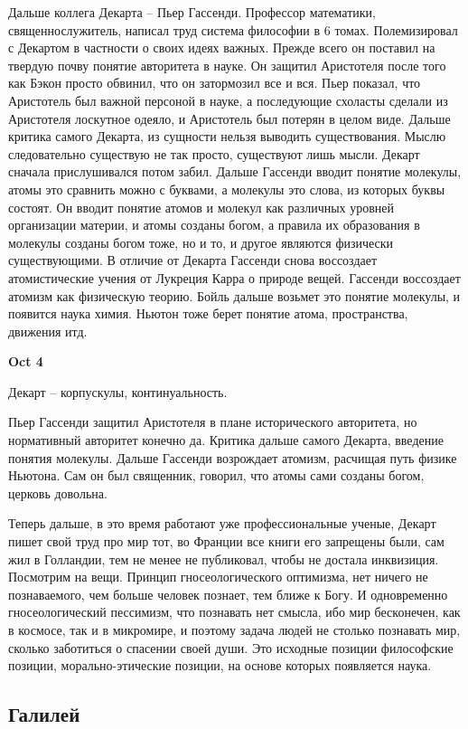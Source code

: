 \documentclass[a4paper, 12pt]{article}
\begin{document}
Дальше коллега Декарта -- Пьер Гассенди. Профессор математики, 
священнослужитель, написал труд система философии в 6 томах. 
Полемизировал с Декартом в частности о своих идеях важных. Прежде всего 
он поставил на твердую почву понятие авторитета в науке. Он защитил 
Аристотеля после того как Бэкон просто обвинил, что он затормозил все 
и вся. Пьер показал, что Аристотель был важной персоной в науке, 
а последующие схоласты сделали из Аристотеля лоскутное одеяло, 
и Аристотель был потерян в целом виде. Дальше критика самого Декарта, из 
сущности нельзя выводить существования. Мыслю следовательно существую не 
так просто, существуют лишь мысли. Декарт сначала прислушивался потом 
забил. Дальше Гассенди вводит понятие молекулы, атомы это сравнить можно 
с буквами, а молекулы это слова, из которых буквы состоят. Он вводит 
понятие атомов и молекул как различных уровней организации материи, 
и атомы созданы богом, а правила их образования в молекулы созданы богом 
тоже, но и то, и другое являются физически существующими. В отличие от 
Декарта Гассенди снова воссоздает атомистические учения от Лукреция 
Карра о природе вещей. Гассенди воссоздает атомизм как физическую 
теорию. Бойль дальше возьмет это понятие молекулы, и появится наука 
химия. Ньютон тоже берет понятие атома, пространства, движения итд.

\hfill \textbf{Oct 4}

Декарт -- корпускулы, континуальность.

Пьер Гассенди защитил Аристотеля в плане исторического авторитета, но 
нормативный авторитет конечно да. Критика дальше самого Декарта, 
введение понятия молекулы. Дальше Гассенди возрождает атомизм, расчищая 
путь физике Ньютона. Сам он был священник, говорил, что атомы сами 
созданы богом, церковь довольна.

Теперь дальше, в это время работают уже профессиональные ученые, Декарт 
пишет свой труд про мир тот, во Франции все книги его запрещены были, 
сам жил в Голландии, тем не менее не публиковал, чтобы не достала 
инквизиция. Посмотрим на вещи. Принцип гносеологического оптимизма, 
нет ничего не познаваемого, чем больше человек познает, тем ближе 
к Богу. И одновременно гносеологический пессимизм, что познавать нет 
смысла, ибо мир бесконечен, как в космосе, так и в микромире, и поэтому 
задача людей не столько познавать мир, сколько заботиться о спасении 
своей души. Это исходные позиции философские позиции, морально-этические 
позиции, на основе которых появляется наука.

\subsection{Галилей}
\end{document}
